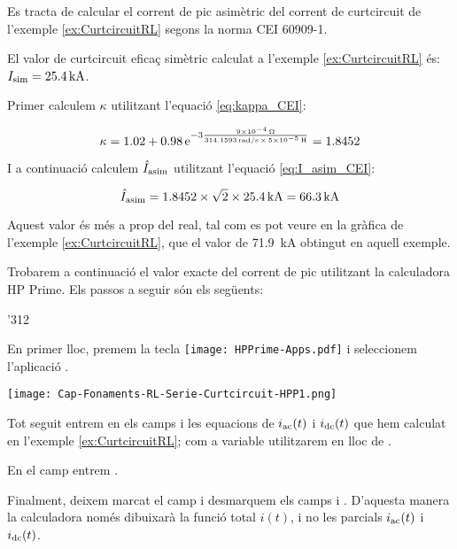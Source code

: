 \begin{exemple}\label{ex:CurtcircuitPicRL}
	\addcontentsxms{\CurtcircuitPicRL}	
    Es tracta de calcular el corrent de pic asimètric del corrent de curtcircuit de l'exemple \ref{ex:CurtcircuitRL} segons la norma CEI 60909-1.

    El valor de curtcircuit eficaç simètric calculat a l'exemple \vref{ex:CurtcircuitRL} és: $I_\mathrm{sim}= \qty{25,4}{kA}$.

    Primer calculem $\kappa$ utilitzant l'equació \eqref{eq:kappa_CEI}:

    \[
    \kappa = \num{1,02} + \num{0,98} \,\mathrm{e}^{-3\frac{\qty{9e-4}{\ohm}}{\qty{314,1593}{rad/s}\, \times\, \qty{5e-5}{H}}} = \num{1,8452}
    \]

    I a continuació calculem $\hat{I}_\mathrm{asim}$ utilitzant l'equació \eqref{eq:I_asim_CEI}:

    \[
    \hat{I}_\mathrm{asim} = \num{1,8452} \times \sqrt{2} \times \qty{25,4}{kA} = \qty{66,3}{kA}
    \]

    Aquest valor és més a prop del real, tal com es pot veure en la gràfica de l'exemple  \ref{ex:CurtcircuitRL}, que el valor de  \qty{71,9}{kA} obtingut en aquell exemple.

    Trobarem a continuació el valor exacte  del corrent de pic utilitzant la calculadora  \textsf{HP Prime}.
     Els passos a seguir són els següents:

     \begin{dingautolist}{'312}

        \item En primer lloc, premem la tecla \texttt{[image: HPPrime-Apps.pdf]} i seleccionem l'aplicació .

             \texttt{[image: Cap-Fonaments-RL-Serie-Curtcircuit-HPP1.png]}

        \item Tot seguit entrem en els camps  i  les equacions de $i_\mathrm{ac}(t)$ i $i_\mathrm{dc}(t)$ que hem calculat en l'exemple \vref{ex:CurtcircuitRL}; com a variable utilitzarem  en lloc de .

            En el camp  entrem .

            Finalment, deixem marcat el camp  i desmarquem els camps  i . D'aquesta manera la calculadora només dibuixarà la funció total $i(t)$, i no les parcials $i_\mathrm{ac}(t)$ i $i_\mathrm{dc}(t)$.



\end{dingautolist}
\end{exemple}
